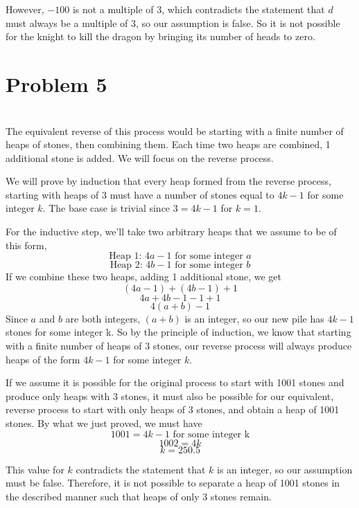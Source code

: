 \documentclass[12pt]{article}
\begin{document}
However, $-100$ is not a multiple of 3, which contradicts the statement that $d$ must always be a multiple of 3, so our assumption is false. So it is not possible for the knight to kill the dragon by bringing its number of heads to zero.


\newpage
\section*{Problem 5}
\\


The equivalent reverse of this process would be starting with a finite number of heaps of stones, then combining them. Each time two heaps are combined, 1 additional stone is added. We will focus on the reverse process.

We will prove by induction that every heap formed from the reverse process, starting with heaps of 3 must have a number of stones equal to $4k-1$ for some integer $k$. The base case is trivial since $3=4k-1$ for $k=1$.

For the inductive step, we'll take two arbitrary heaps that we assume to be of this form,
\[\text{Heap 1: } 4a-1 \text{ for some integer } a\]
\[\text{Heap 2: } 4b-1 \text{ for some integer } b\]
If we combine these two heaps, adding 1 additional stone, we get
\[(4a-1) + (4b-1) +1\]
\[4a + 4b -1 -1 +1\]
\[4(a+b) -1\]
Since $a$ and $b$ are both integers, $(a+b)$ is an integer, so our new pile has $4k-1$ stones for some integer k. So by the principle of induction, we know that starting with a finite number of heaps of 3 stones, our reverse process will always produce heaps of the form $4k-1$ for some integer $k$.

If we assume it is possible for the original process to start with 1001 stones and produce only heaps with 3 stones, it must also be possible for our equivalent, reverse process to start with only heaps of 3 stones, and obtain a heap of 1001 stones. By what we just proved, we must have
\[1001 = 4k - 1 \text{ for some integer k}\]
\[1002 = 4k\]
\[k = 250.5\]

This value for $k$ contradicts the statement that $k$ is an integer, so our assumption must be false. Therefore, it is not possible to separate a heap of 1001 stones in the described manner such that heaps of only 3 stones remain.
\end{document}
